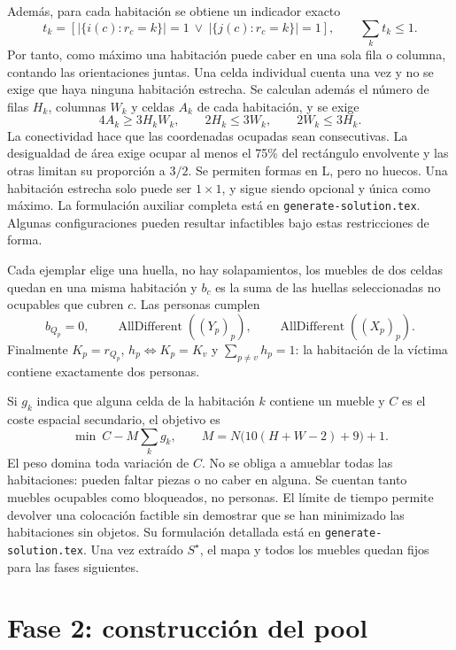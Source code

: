 \documentclass[11pt,a4paper]{article}
\begin{document}
Adem\'as, para cada habitaci\'on se obtiene un indicador exacto
\[
 t_k=
 \left[
 \left|\{i(c):r_c=k\}\right|=1
 \ \lor\
 \left|\{j(c):r_c=k\}\right|=1
 \right],
 \qquad \sum_k t_k\leq1.
\]
Por tanto, como m\'aximo una habitaci\'on puede caber en una sola
fila o columna, contando las orientaciones juntas. Una celda
individual cuenta una vez y no se exige que haya ninguna habitaci\'on
estrecha. Se calculan adem\'as el n\'umero de filas $H_k$,
columnas $W_k$ y celdas $A_k$ de cada habitaci\'on, y se exige
\[
 4A_k\geq3H_kW_k,\qquad 2H_k\leq3W_k,\qquad 2W_k\leq3H_k.
\]
La conectividad hace que las coordenadas ocupadas sean consecutivas.
La desigualdad de \'area exige ocupar al menos el 75\% del
rect\'angulo envolvente y las otras limitan su proporci\'on a $3/2$.
Se permiten formas en L, pero no huecos. Una habitaci\'on estrecha
solo puede ser $1\times1$, y sigue siendo opcional y \'unica como
m\'aximo. La formulaci\'on auxiliar completa est\'a en
\texttt{generate-solution.tex}. Algunas configuraciones pueden
resultar infactibles bajo estas restricciones de forma.

Cada ejemplar elige una huella, no hay solapamientos, los muebles de
dos celdas quedan en una misma habitaci\'on y $b_c$ es la suma de
las huellas seleccionadas no ocupables que cubren $c$.
Las personas cumplen
\[
 b_{Q_p}=0,\qquad
 \operatorname{AllDifferent}((Y_p)_p),\qquad
 \operatorname{AllDifferent}((X_p)_p).
\]
Finalmente $K_p=r_{Q_p}$, $h_p\Longleftrightarrow K_p=K_v$ y
$\sum_{p\neq v}h_p=1$: la habitaci\'on de la v\'ictima contiene
exactamente dos personas.

Si $g_k$ indica que alguna celda de la habitaci\'on $k$ contiene
un mueble y $C$ es el coste espacial secundario, el objetivo es
\[
 \min\ C-M\sum_k g_k,\qquad
 M=N\bigl(10(H+W-2)+9\bigr)+1.
\]
El peso domina toda variaci\'on de $C$. No se obliga a amueblar
todas las habitaciones: pueden faltar piezas o no caber en alguna.
Se cuentan tanto muebles ocupables como bloqueados, no personas.
El l\'imite de tiempo permite devolver una colocaci\'on factible
sin demostrar que se han minimizado las habitaciones sin objetos.
Su formulaci\'on detallada est\'a en
\texttt{generate-solution.tex}. Una vez extra\'ido $S^\star$, el mapa
y todos los muebles quedan fijos para las fases siguientes.

\section{Fase 2: construcci\'on del pool}
\end{document}
